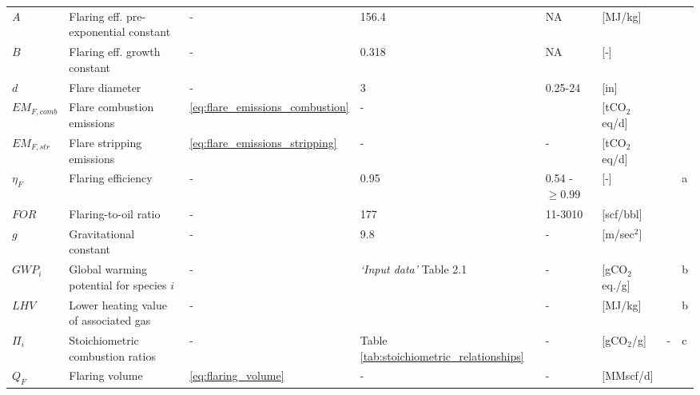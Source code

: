 \documentclass[11pt]{report}
\newcommand{\sheet}[1]{\textit{`{#1}'}}
\begin{document}
\begin{landscape}
\begin{scriptsize}
\tablelasttail{\bottomrule}
\label{tab:defaults_flaring}
\begin{supertabular*}{1.01\columnwidth}{p{0.05\columnwidth}p{0.3\columnwidth}p{0.03\columnwidth}p{0.15\columnwidth}p{0.1\columnwidth}p{0.09\columnwidth}p{0.1\columnwidth}p{0.05\columnwidth}}
$A$ & Flaring eff. pre-exponential constant & - & 156.4 & NA & [MJ/kg] & \cite{Johnson2002} & \\ 
$B$ & Flaring eff. growth constant & - & 0.318 & NA & [-] & \cite{Johnson2002} & \\ 
$d$ & Flare diameter & - & 3 & 0.25-24 & [in] & & \\ 
$EM_{F,comb} $ & Flare combustion emissions & \eqref{eq:flare_emissions_combustion} & - & & [tCO$_{2}$eq/d] & & \\ 
$EM_{F,str} $ & Flare stripping emissions & \eqref{eq:flare_emissions_stripping} & - & - & [tCO$_{2}$eq/d] & & \\ 
$\eta_F $ & Flaring efficiency & - & 0.95 & 0.54 - $\geq 0.99$ & [-] & \cite{Johnson2000, Johnson2001, Johnson2008} & a \\ 
$FOR $ & Flaring-to-oil ratio & - & 177 & 11-3010 & [scf/bbl] & & \\ 
$g $ & Gravitational constant & - & 9.8 & - & [m/sec$^2$] & & \\ 
$GWP_i$ & Global warming potential for species $i$ & - & \sheet{Input data} Table 2.1 & - & [gCO$_2$eq./g] & \cite{IPCC2007} & b \\
$LHV$ & Lower heating value of associated gas & - & & - & [MJ/kg] & & b \\
$\Pi_i$ & Stoichiometric combustion ratios & - & Table \ref{tab:stoichiometric_relationships} & - & [gCO$_2$/g] & - & c \\
$Q_F$ & Flaring volume & \eqref{eq:flaring_volume} & - & - & [MMscf/d] & & \\ 

\end{supertabular*}
\end{scriptsize}
\end{landscape}
\end{document}
